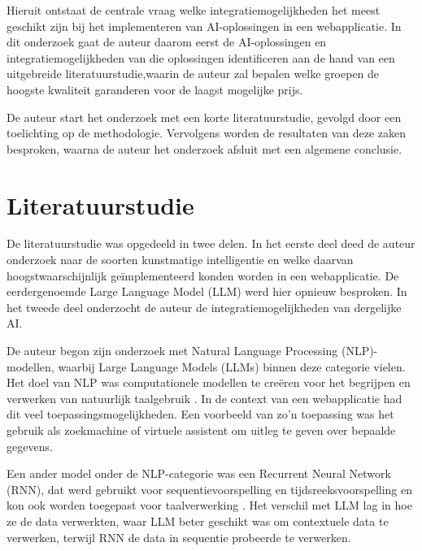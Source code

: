 \documentclass[dutch]{hogent-article}
\begin{document}
  Hieruit ontstaat de centrale vraag welke integratiemogelijkheden het meest geschikt zijn bij het implementeren van AI-oplossingen in een webapplicatie. In dit onderzoek gaat de auteur daarom eerst de AI-oplossingen en integratiemogelijkheden van die oplossingen identificeren aan de hand van een uitgebreide literatuurstudie,\linebreak waarin de auteur zal bepalen welke groepen de hoogste kwaliteit garanderen voor de laagst mogelijke prijs.
  
  De auteur start het onderzoek met een korte literatuurstudie, gevolgd door een toelichting op de methodologie. Vervolgens worden de resultaten van deze zaken besproken, waarna de auteur het onderzoek afsluit met een algemene conclusie.
  

\section{Literatuurstudie}%
\label{sec:literature review}


De literatuurstudie was opgedeeld in twee delen. In het eerste deel deed de auteur onderzoek naar de soorten kunstmatige intelligentie en welke daarvan hoogstwaarschijnlijk geïmplementeerd konden worden in een webapplicatie. De eerdergenoemde Large Language Model (LLM) werd hier opnieuw besproken. In het tweede deel onderzocht de auteur de integratiemogelijkheden van dergelijke AI.

De auteur begon zijn onderzoek met Natural Language Processing (NLP)-modellen, waarbij Large Language Models (LLMs) binnen deze categorie vielen. Het doel van NLP was computationele modellen te creëren voor het begrijpen en verwerken van natuurlijk taalgebruik \autocite{Bharati2002}. In de context van een webapplicatie had dit veel toepassingsmogelijkheden. Een voorbeeld van zo'n toepassing was het gebruik als zoekmachine of virtuele assistent om uitleg te geven over bepaalde gegevens.

Een ander model onder de NLP-categorie was een Recurrent Neural Network (RNN), dat werd gebruikt voor sequentievoorspelling en tijdsreeksvoorspelling en kon ook worden toegepast voor taalverwerking \autocite{IBMRNN2023}. Het verschil met LLM lag in hoe ze de data verwerkten, waar LLM beter geschikt was om contextuele data te verwerken, terwijl RNN de data in sequentie probeerde te verwerken.
\end{document}
